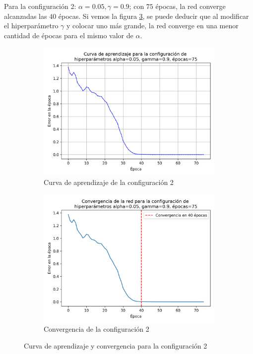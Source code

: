 \documentclass{article}
\begin{document}
Para la configuración 2: $\alpha=0.05, \gamma=0.9$; con $75$ épocas, la red converge alcanzadas las $40$ épocas. Si vemos la figura \ref{fig:conf2_lr_con_xor}, se puede deducir que al modificar el hiperparámetro $\gamma$ y colocar uno más grande, la red converge en una menor cantidad de épocas para el mismo valor de $\alpha$. 

\newpage
\begin{figure}[h!]
    \centering
    \begin{subfigure}{0.49\textwidth}
        \includegraphics[width=\textwidth]{imgs/XOR/configs/curva_aprendizaje_alpha_0.05_gamma_0.9_epochs_75.png}
        \caption{Curva de aprendizaje de la configuración 2}
        \label{fig:conf_2_xor_lr}
    \end{subfigure}
    \hfill
    \begin{subfigure}{0.49\textwidth}
        \includegraphics[width=\textwidth]{imgs/XOR/configs/convergencia_alpha_0.05_gamma_0.9_epochs_75.png}
        \caption{Convergencia de la configuración 2}
        \label{fig:conf2_xor_con}
    \end{subfigure}
    \caption{Curva de aprendizaje y convergencia para la configuración 2}
    \label{fig:conf2_lr_con_xor}
\end{figure}
\end{document}
